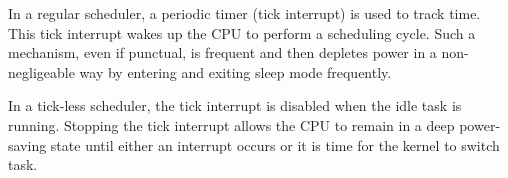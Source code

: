 In a regular scheduler, a periodic timer (tick interrupt) is used to track time.
This tick interrupt wakes up the CPU to perform a scheduling cycle.
Such a mechanism, even if punctual, is frequent and then depletes power in a non-negligeable way by entering and exiting sleep mode frequently.

In a tick-less scheduler, the tick interrupt is disabled when the idle task is running.
Stopping the tick interrupt allows the CPU to remain in a deep power-saving state 
    until either an interrupt occurs or it is time for the kernel to switch task.

